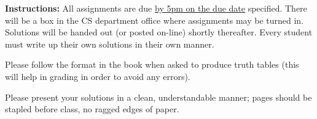 \documentclass[12pt,addpoints]{exam}
\begin{document}
\extrawidth{0.5in} \extrafootheight{-0in} \pagestyle{headandfoot}
\headrule {} \footrule {}

\noindent \textbf{Instructions:} All assignments are due \underline{by 5pm on the due date} specified.  There will be a box in the CS department office where assignments may be turned in.  Solutions will be handed out (or posted on-line) shortly thereafter.  Every student
must write up their own solutions in their own manner.

\smallskip
\noindent Please follow the format in the book when asked to produce
truth tables (this will help in grading in order to avoid any
errors).

\smallskip
\noindent Please present your solutions in a clean, understandable
manner; pages should be stapled before class, no ragged edges of
paper.

\end{document}
